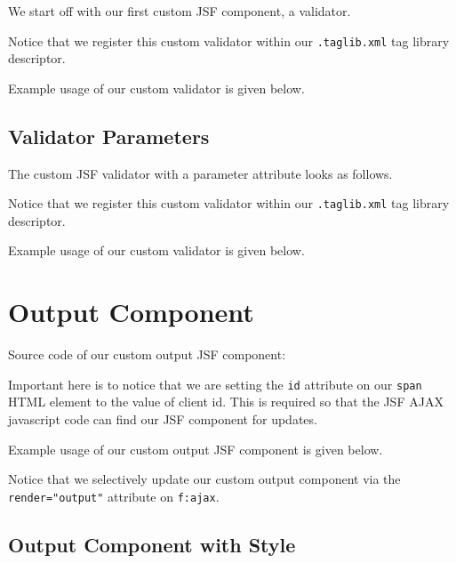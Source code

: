 We start off with our first custom JSF component, a validator.


Notice that we register this custom validator within our \texttt{.taglib.xml} tag library descriptor.

Example usage of our custom validator is given below.


\subsection{Validator Parameters}

The custom JSF  validator with a parameter attribute looks as follows.


Notice that we register this custom validator within our \texttt{.taglib.xml} tag library descriptor.

Example usage of our custom validator is given below.


\section{Output Component}

Source code of our custom output JSF component:


Important here is to notice that we are setting the \texttt{id} attribute on our \texttt{span} HTML element to the value of client id.
This is required so that the JSF AJAX javascript code can find our JSF component for updates.

Example usage of our custom output JSF component is given below.


Notice that we selectively update our custom output component via the \texttt{render="output"} attribute on \texttt{f:ajax}.

\subsection{Output Component with Style}


